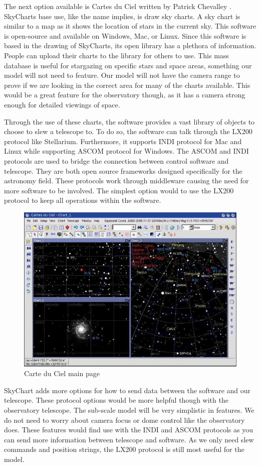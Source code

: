 \documentclass[12pt]{article}
\begin{document}
The next option available is Cartes du Ciel written by Patrick Chevalley \cite{skychart}. SkyCharts base use, like the name implies, is draw sky charts. A sky chart is similar to a map as it shows the location of stars in the current sky. This software is open-source and available on Windows, Mac, or Linux. Since this software is based in the drawing of SkyCharts, its open library has a plethora of information. People can upload their charts to the library for others to use. This mass database is useful for stargazing on specific stars and space areas, something our model will not need to feature. Our model will not have the camera range to prove if we are looking in the correct area for many of the charts available. This would be a great feature for the observatory though, as it has a camera strong enough for detailed viewings of space.

Through the use of these charts, the software provides a vast library of objects to choose to slew a telescope to. To do so, the software can talk through the LX200 protocol like Stellarium. Furthermore, it supports INDI protocol for Mac and Linux while supporting ASCOM protocol for Windows. The ASCOM and INDI protocols are used to bridge the connection between control software and telescope. They are both open source frameworks designed specifically for the astronomy field. These protocols work through middleware causing the need for more software to be involved. The simplest option would to use the LX200 protocol to keep all operations within the software.

\begin{figure}[h]
	\centering
	\includegraphics[width=0.75\linewidth]{carte}
	\caption{Carte du Ciel main page}
	\label{fig:carte}
\end{figure}

SkyChart adds more options for how to send data between the software and our telescope. These protocol options would be more helpful though with the observatory telescope. The sub-scale model will be very simplistic in features. We do not need to worry about camera focus or dome control like the observatory does. These features would find use with the INDI and ASCOM protocols as you can send more information between telescope and software. As we only need slew commands and position strings, the LX200 protocol is still most useful for the model.
\end{document}
